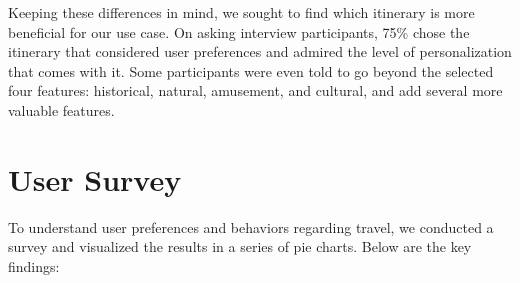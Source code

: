 \documentclass[sigconf,authordraft]{acmart}
\begin{document}
Keeping these differences in mind, we sought to find which
itinerary is more beneficial for our use case. On asking interview participants, 75\% chose the itinerary that considered user preferences and admired the level of personalization that comes with it. Some participants were even told to go beyond the selected four features: historical, natural, amusement, and cultural, and add several more valuable features.
\newpage

\section{User Survey}

To understand user preferences and behaviors regarding travel, we conducted a survey and visualized the results in a series of pie charts. Below are the key findings:
\end{document}
